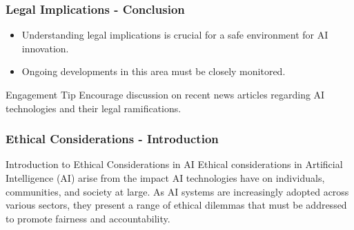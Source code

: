 \documentclass[aspectratio=169]{beamer}
\begin{document}
\begin{frame}[fragile]
    \frametitle{Legal Implications - Conclusion}
    \begin{itemize}
        \item Understanding legal implications is crucial for a safe environment for AI innovation.
        \item Ongoing developments in this area must be closely monitored.
    \end{itemize}
    \begin{block}{Engagement Tip}
        Encourage discussion on recent news articles regarding AI technologies and their legal ramifications.
    \end{block}
\end{frame}

\begin{frame}[fragile]
    \frametitle{Ethical Considerations - Introduction}
    \begin{block}{Introduction to Ethical Considerations in AI}
        Ethical considerations in Artificial Intelligence (AI) arise from the impact AI technologies have on individuals, communities, and society at large. As AI systems are increasingly adopted across various sectors, they present a range of ethical dilemmas that must be addressed to promote fairness and accountability.
    \end{block}
\end{frame}
\end{document}
